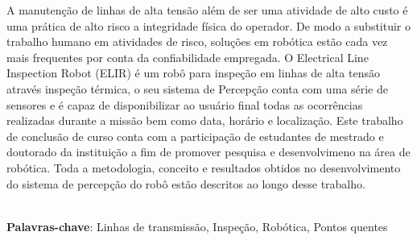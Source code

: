 \begin{thesisresumo}
A manutenção de linhas de alta tensão além de ser uma atividade de alto custo é uma prática de alto risco a integridade física do operador. De modo a substituir o trabalho humano em atividades de risco, soluções em robótica estão cada vez mais frequentes por conta da confiabilidade empregada. O Electrical Line Inspection Robot (ELIR) é um robô para inspeção em linhas de alta tensão através inspeção térmica, o seu sistema de Percepção conta com uma série de sensores e é capaz de disponibilizar ao usuário final todas as ocorrências realizadas durante a missão bem como data, horário e localização. Este trabalho de conclusão de curso conta com a participação de estudantes de mestrado e doutorado da instituição a fim de promover pesquisa e desenvolvimeno na área de robótica. Toda a metodologia, conceito e resultados obtidos no desenvolvimento do sistema de percepção do robô estão descritos ao longo desse trabalho.

\ \\


\textbf{Palavras-chave}: Linhas de transmissão, Inspeção, Robótica, Pontos quentes

\end{thesisresumo}

